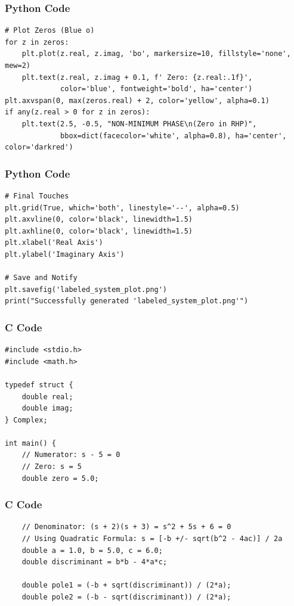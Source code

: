 \documentclass{beamer}
\begin{document}
\begin{frame}[fragile]
\frametitle{Python Code}
\begin{lstlisting}
# Plot Zeros (Blue o)
for z in zeros:
    plt.plot(z.real, z.imag, 'bo', markersize=10, fillstyle='none', mew=2)
    plt.text(z.real, z.imag + 0.1, f' Zero: {z.real:.1f}', 
             color='blue', fontweight='bold', ha='center')
plt.axvspan(0, max(zeros.real) + 2, color='yellow', alpha=0.1)
if any(z.real > 0 for z in zeros):
    plt.text(2.5, -0.5, "NON-MINIMUM PHASE\n(Zero in RHP)", 
             bbox=dict(facecolor='white', alpha=0.8), ha='center', color='darkred')
\end{lstlisting}
\end{frame}

\begin{frame}[fragile]
\frametitle{Python Code}
\begin{lstlisting}
# Final Touches
plt.grid(True, which='both', linestyle='--', alpha=0.5)
plt.axvline(0, color='black', linewidth=1.5)
plt.axhline(0, color='black', linewidth=1.5)
plt.xlabel('Real Axis')
plt.ylabel('Imaginary Axis')

# Save and Notify
plt.savefig('labeled_system_plot.png')
print("Successfully generated 'labeled_system_plot.png'")
\end{lstlisting}
\end{frame}

\begin{frame}[fragile]
\frametitle{C Code}
\begin{lstlisting}
#include <stdio.h>
#include <math.h>

typedef struct {
    double real;
    double imag;
} Complex;

int main() {
    // Numerator: s - 5 = 0
    // Zero: s = 5
    double zero = 5.0;
\end{lstlisting}
\end{frame}

\begin{frame}[fragile]
\frametitle{C Code}
\begin{lstlisting}
    // Denominator: (s + 2)(s + 3) = s^2 + 5s + 6 = 0
    // Using Quadratic Formula: s = [-b +/- sqrt(b^2 - 4ac)] / 2a
    double a = 1.0, b = 5.0, c = 6.0;
    double discriminant = b*b - 4*a*c;
    
    double pole1 = (-b + sqrt(discriminant)) / (2*a);
    double pole2 = (-b - sqrt(discriminant)) / (2*a);
\end{lstlisting}
\end{frame}
\end{document}
